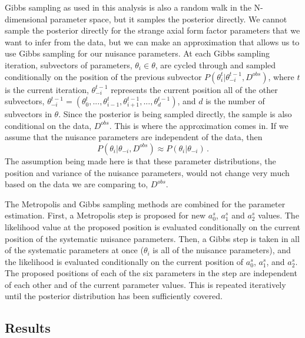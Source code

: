     Gibbs sampling as used in this analysis is also a random walk in the
    N-dimensional parameter space, but it samples the posterior directly. We
    cannot sample the posterior directly for the strange axial form factor
    parameters that we want to infer from the data, but we can make an
    approximation that allows us to use Gibbs sampling for our nuisance
    parameters. At each Gibbs sampling iteration, subvectors of parameters,
    $\theta_i \in \theta$, are cycled through and sampled conditionally on the
    position of the previous subvector
    $P(\theta_i^t|\theta_{-i}^{t-1},D^{obs})$, where $t$ is the current
    iteration, $\theta_{-i}^{t-1}$ represents the current position all of the
    other subvectors, $\theta_{-i}^{t-1} =
    (\theta_0^t,...,\theta_{i-1}^t,\theta_{i+1}^{t-1},...,\theta_d^{t-1})$, and
    $d$ is the number of subvectors in $\theta$.  Since the posterior is being
    sampled directly, the sample is also conditional on the data, $D^{obs}$.
    This is where the approximation comes in. If we assume that the nuisance
    parameters are independent of the data, then
    \begin{equation}\label{eq:gibbsstep}
      P(\theta_i|\theta_{-i},D^{obs}) \approx P(\theta_i|\theta_{-i}) \,.
    \end{equation}
    The assumption being made here is that these parameter distributions, the
    position and variance of the nuisance parameters, would not change very
    much based on the data we are comparing to, $D^{obs}$. 

    The Metropolis and Gibbs sampling methods are combined for the parameter
    estimation.  First, a Metropolis step is proposed for new $a_0^s$, $a_1^s$
    and $a_2^s$ values. The likelihood value at the proposed position is
    evaluated conditionally on the current position of the systematic nuisance
    parameters.  Then, a Gibbs step is taken in all of the systematic
    parameters at once ($\theta_i$ is all of the nuisance parameters), and the
    likelihood is evaluated conditionally on the current position of $a_0^s$,
    $a_1^s$, and $a_2^s$. The proposed positions of each of the six parameters
    in the step are independent of each other and of the current parameter
    values.  This is repeated iteratively until the posterior distribution has
    been sufficiently covered.


\subsection{Results}\label{sec:results}

